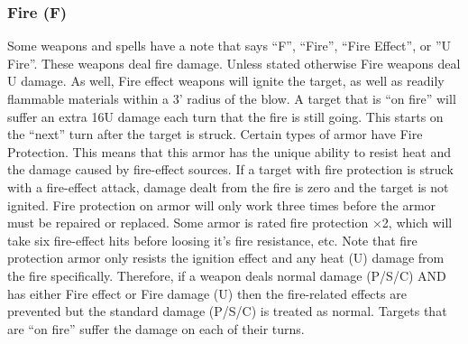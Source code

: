\documentclass[twoside]{book}
\begin{document}
\subsubsection{Fire (F)}
     Some weapons and spells have a note that says
                 “F”, “Fire”, “Fire
                 Effect”, or ”U Fire”. These weapons
                 deal fire damage. Unless stated otherwise Fire weapons
                 deal U damage. As well, Fire effect weapons will ignite
                 the target, as well as readily flammable materials
                 within a 3’ radius of the blow. A target that is
                 “on fire” will suffer an extra 16U damage
                 each turn that the fire is still going. This starts on
                 the “next” turn after the target is struck.
                 Certain types of armor have Fire Protection. This means
                 that this armor has the unique ability to resist heat
                 and the damage caused by fire-effect sources. If a
                 target with fire protection is struck with a fire-effect
                 attack, damage dealt from the fire is zero and the
                 target is not ignited. Fire protection on armor will
                 only work three times before the armor must be repaired
                 or replaced. Some armor is rated fire protection
                 ×2, which will take six fire-effect hits before
                 loosing it’s fire resistance, etc. Note that fire
                 protection armor only resists the ignition effect and
                 any heat (U) damage from the fire specifically.
                 Therefore, if a weapon deals normal damage (P/S/C) AND
                 has either Fire effect or Fire damage (U) then the
                 fire-related effects are prevented but the standard
                 damage (P/S/C) is treated as normal. Targets that are
                 “on fire” suffer the damage on each of their
                 turns. 
  
  
\end{document}
